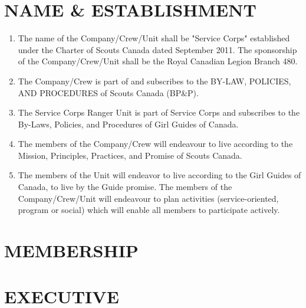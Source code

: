 \documentclass{Service_Corps_Document}
\begin{document}
    \def \Title {Constitution}
    \def \Company {Service Corps}
    \def \versionNumber {4.3}
    \stdFooter
    \begin{titlepage}
        \stdTitlePage
    \end{titlepage}

    \tableofcontents

    \newpage


    \section{NAME \& ESTABLISHMENT}\label{sec:name-&-establishment}
    \begin{enumerate}
        \item The name of the Company/Crew/Unit shall be "Service Corps" established under the Charter of Scouts Canada dated September 2011.
        The sponsorship of the Company/Crew/Unit shall be the Royal Canadian Legion Branch 480.
        \item The Company/Crew is part of and subscribes to the BY-LAW, POLICIES, AND PROCEDURES of Scouts Canada (BP\&P).
        \item The Service Corps Ranger Unit is part of Service Corps and subscribes to the By-Laws, Policies, and Procedures of Girl Guides of Canada.
        \item The members of the Company/Crew will endeavour to live according to the Mission, Principles, Practices, and Promise of Scouts Canada.
        \item The members of the Unit will endeavor to live according to the Girl Guides of Canada, to live by the Guide promise.
        The members of the Company/Crew/Unit will endeavour to plan activities (service-oriented, program or social) which will enable all members to participate actively.
    \end{enumerate}


    \section{MEMBERSHIP}\label{sec:membership}
    


    \section{EXECUTIVE}\label{sec:executive}
    
\end{document}
